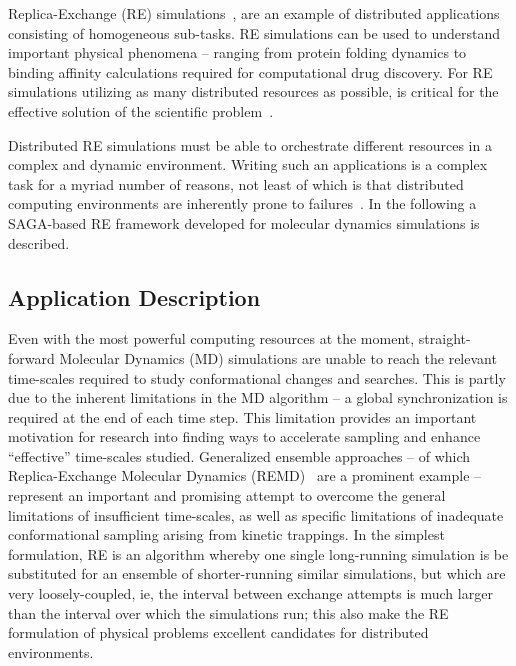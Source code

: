 \documentclass{llncs}
\begin{document}

Replica-Exchange (RE) simulations~\cite{Sugita:1999rm},
\cite{hansmann} are an example of distributed applications consisting
of homogeneous sub-tasks. RE simulations can be used to understand
important physical phenomena -- ranging from protein folding dynamics
to binding affinity calculations required for computational drug
discovery.  For RE simulations utilizing as many distributed resources
as possible, is critical for the effective solution of the scientific
problem~\cite{repex_ptrsa}.

Distributed RE simulations must be able to orchestrate different
resources in a complex and dynamic environment.  Writing such an
applications is a complex task for a myriad number of reasons, not
least of which is that distributed computing environments are
inherently prone to failures~\cite{Luckow:2008la}. In the following a
SAGA-based RE framework developed for molecular dynamics simulations
is described.

\up

\subsection{Application Description}

\up


Even with the most powerful computing resources at the moment,
straight-forward Molecular Dynamics (MD) simulations are unable to
reach the relevant time-scales required to study conformational
changes and searches. This is partly due to the inherent limitations
in the MD algorithm -- a global synchronization is required at the end
of each time step.  This limitation provides an important motivation
for research into finding ways to accelerate sampling and enhance
``effective'' time-scales studied. Generalized ensemble approaches --
of which Replica-Exchange Molecular Dynamics
(REMD)~\cite{Sugita:1999rm} are a prominent example -- represent an
important and promising attempt to overcome the general limitations of
insufficient time-scales, as well as specific limitations of
inadequate conformational sampling arising from kinetic trappings.  In
the simplest formulation, RE is an algorithm whereby one
single long-running simulation is be substituted for an ensemble of
shorter-running similar simulations, but which are very
loosely-coupled, ie, the interval between exchange attempts is much
larger than the interval over which the simulations run; this also
make the RE formulation of physical problems excellent
candidates for distributed environments.
\end{document}
